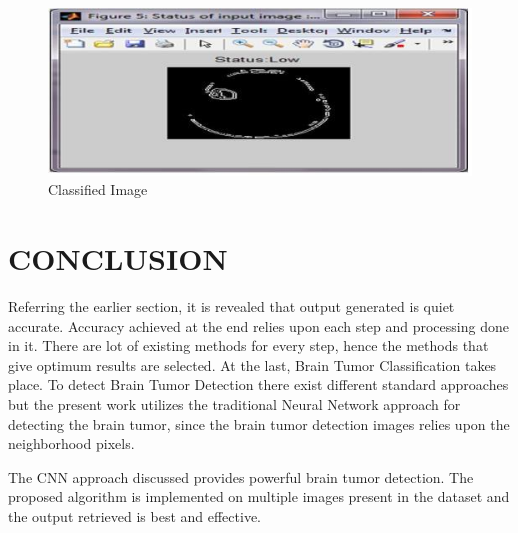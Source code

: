 \documentclass[a4paper, 12pt]{report}
\begin{document}
\begin{spacing}{1.5}
\begin{figure}[h]
	\centering
	\includegraphics[width=0.7\linewidth]{./classified}
	\caption{Classified Image}
\end{figure}
\newpage

\chapter{CONCLUSION}
\par Referring the earlier section, it is revealed that output generated is quiet accurate. Accuracy achieved at the end relies upon each step and processing done in it. There are lot
of existing methods for every step, hence the methods that give optimum results are selected. At the last, Brain Tumor Classification takes place. To detect Brain Tumor Detection there exist different standard approaches but the present work utilizes the traditional Neural Network approach for detecting the brain tumor, since the brain tumor detection images relies upon the neighborhood pixels.\\
\par The CNN approach discussed provides powerful brain tumor detection. The proposed algorithm is implemented on multiple images present in the dataset and the output retrieved is best and effective.\\
\label{References}


\end{spacing}
\end{document}
